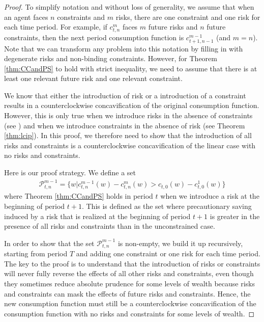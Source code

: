 \begin{proof}
	To simplify notation and without loss of generality, we assume that when an agent faces $n$ constraints and $m$ risks, there are one constraint and one risk for each time period. For example, if $c_{t,n}^{m}$ faces $m$ future risks and $n$ future constraints, then the next period consumption function is $c_{t+1,n-1}^{m-1}$ (and $m = n$). Note that we can transform any problem into this notation by filling in with degenerate risks and non-binding constraints. However, for Theorem \ref{thm:CCandPS} to hold with strict inequality, we need to assume that there is at least one relevant future risk and one relevant constraint.
	
	We know that either the introduction of risk or a introduction of a constraint results in a counterclockwise concavification of the original consumption function. However, this is only true when we introduce risks in the absence of constraints (see \citealp{carroll&kimball:concavity}) and when we introduce constraints in the absence of risk (see Theorem \ref{thm:lcip}). In this proof, we therefore need to show that the introduction of all risks and constraints is a counterclockwise concavification of the linear case with no risks and constraints.
	
	Here is our proof strategy. We define a set
	\begin{align}
	\mathcal{P}_{t,n}^{m-1} = \{ w | c_{t,n}^{m-1}(w)-c_{t,n}^{m}(w)>c_{t,0}(w)-c^{1}_{t,0}(w) \} \label{eq:whatcanbesaid_proof}
	\end{align}
	where Theorem \ref{thm:CCandPS} holds in period $t$ when we introduce a risk at the beginning of period $t+1$. This is defined as the set where precautionary saving induced by a risk that is realized at the beginning of period $t+1$ is greater in the presence of all risks and constraints than in the unconstrained case.
	
	In order to show that the set $\mathcal{P}_{t,n}^{m-1}$ is non-empty, we build it up recursively, starting from period $T$ and adding one constraint or one risk  for each time period. The key to the proof is to understand that the introduction of risks or constraints will never fully reverse the effects of all other risks and constraints, even though they sometimes reduce absolute prudence for some levels of wealth because risks and constraints can mask the effects of future risks and constraints. Hence, the new consumption function must still be a counterclockwise concavification of the consumption function with no risks and constraints for some levels of wealth.
	

\end{proof}
